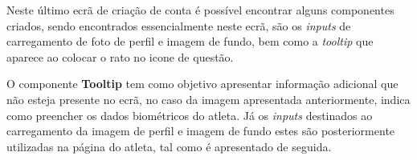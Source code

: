 Neste último ecrã de criação de conta é possível encontrar alguns componentes criados, sendo encontrados essencialmente neste ecrã, são os \textit{inputs} de carregamento de foto de perfil e imagem de fundo, bem como a \textit{tooltip} que aparece ao colocar o rato no icone de questão.

\begin{minipage}{0.45\textwidth}
\end{minipage}
\begin{minipage}{0.45\textwidth}
\end{minipage}

O componente \textbf{Tooltip} tem como objetivo apresentar informação adicional que não esteja presente no ecrã, no caso da imagem apresentada anteriormente, indica como preencher os dados biométricos do atleta. Já os \textit{inputs} destinados ao carregamento da imagem de perfil e imagem de fundo estes são posteriormente utilizadas na página do atleta, tal como é apresentado de seguida.

